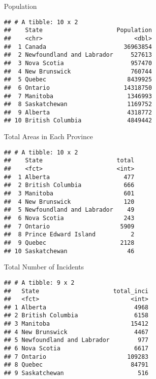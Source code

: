 \documentclass[ignorenonframetext,]{beamer}
\begin{document}
\begin{frame}[fragile]{Population}

\begin{verbatim}
## # A tibble: 10 x 2
##    State                     Population
##    <chr>                          <dbl>
##  1 Canada                      36963854
##  2 Newfoundland and Labrador     527613
##  3 Nova Scotia                   957470
##  4 New Brunswick                 760744
##  5 Quebec                       8439925
##  6 Ontario                     14318750
##  7 Manitoba                     1346993
##  8 Saskatchewan                 1169752
##  9 Alberta                      4318772
## 10 British Columbia             4849442
\end{verbatim}

\end{frame}

\begin{frame}[fragile]{Total Areas in Each Province}

\begin{verbatim}
## # A tibble: 10 x 2
##    State                     total
##    <fct>                     <int>
##  1 Alberta                     477
##  2 British Columbia            666
##  3 Manitoba                    601
##  4 New Brunswick               120
##  5 Newfoundland and Labrador    49
##  6 Nova Scotia                 243
##  7 Ontario                    5909
##  8 Prince Edward Island          2
##  9 Quebec                     2128
## 10 Saskatchewan                 46
\end{verbatim}

\end{frame}

\begin{frame}[fragile]{Total Number of Incidents}

\begin{verbatim}
## # A tibble: 9 x 2
##   State                     total_inci
##   <fct>                          <int>
## 1 Alberta                         4968
## 2 British Columbia                6158
## 3 Manitoba                       15412
## 4 New Brunswick                   4467
## 5 Newfoundland and Labrador        977
## 6 Nova Scotia                     6617
## 7 Ontario                       109283
## 8 Quebec                         84791
## 9 Saskatchewan                     516
\end{verbatim}

\end{frame}
\end{document}
